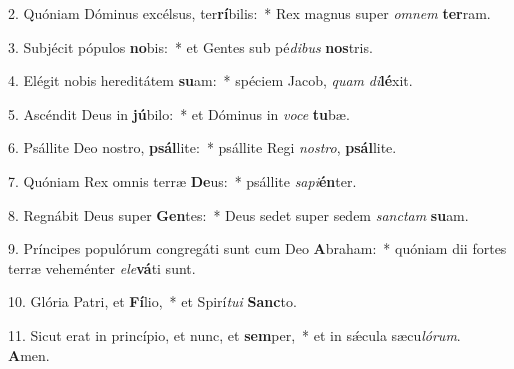 2. Quóniam Dóminus excélsus, ter\textbf{rí}bilis:~*  Rex magnus super \textit{om}\textit{nem} \textbf{ter}ram.\

3. Subjécit pópulos \textbf{no}bis:~*  et Gentes sub pé\textit{di}\textit{bus} \textbf{nos}tris.\

4. Elégit nobis hereditátem \textbf{su}am:~*  spéciem Jacob, \textit{quam} \textit{di}\textbf{lé}xit.\

5. Ascéndit Deus in \textbf{jú}bilo:~*  et Dóminus in \textit{vo}\textit{ce} \textbf{tu}bæ.\

6. Psállite Deo nostro, \textbf{psál}lite:~*  psállite Regi \textit{nos}\textit{tro}, \textbf{psál}lite.\

7. Quóniam Rex omnis terræ \textbf{De}us:~*  psállite \textit{sa}\textit{pi}\textbf{én}ter.\

8. Regnábit Deus super \textbf{Gen}tes:~*  Deus sedet super sedem \textit{sanc}\textit{tam} \textbf{su}am.\

9. Príncipes populórum congregáti sunt cum Deo \textbf{A}braham:~*  quóniam dii fortes terræ veheménter \textit{e}\textit{le}\textbf{vá}ti sunt.\

10. Glória Patri, et \textbf{Fí}lio,~*  et Spirí\textit{tu}\textit{i} \textbf{Sanc}to.\

11. Sicut erat in princípio, et nunc, et \textbf{sem}per,~*  et in sǽcula sæcu\textit{ló}\textit{rum}. \textbf{A}men.\

